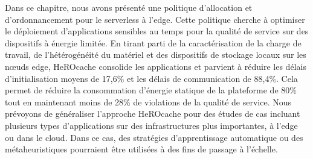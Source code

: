 Dans ce chapitre, nous avons présenté une politique d'allocation et d'ordonnancement pour le serverless à l'edge. Cette politique cherche à optimiser le déploiement d'applications sensibles au temps pour la qualité de service sur des dispositifs à énergie limitée. En tirant parti de la caractérisation de la charge de travail, de l'hétérogénéité du matériel et des dispositifs de stockage locaux sur les nœuds edge, HeROcache consolide les applications et parvient à réduire les délais d'initialisation moyens de 17,6\% et les délais de communication de 88,4\%. Cela permet de réduire la consommation d'énergie statique de la plateforme de 80\% tout en maintenant moins de 28\% de violations de la qualité de service. Nous prévoyons de généraliser l'approche HeROcache pour des études de cas incluant plusieurs types d'applications sur des infrastructures plus importantes, à l'edge ou dans le cloud. Dans ce cas, des stratégies d'apprentissage automatique ou des métaheuristiques pourraient être utilisées à des fins de passage à l'échelle.
